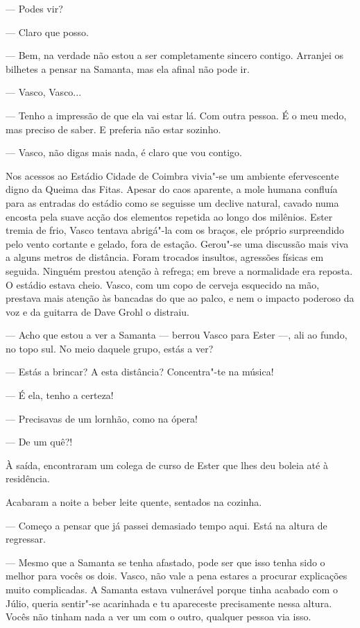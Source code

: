 --- Podes vir?

--- Claro que posso.

--- Bem, na verdade não estou a ser completamente sincero contigo.
  Arranjei os bilhetes a pensar na Samanta, mas ela afinal não pode ir.

--- Vasco, Vasco...

--- Tenho a impressão de que ela vai estar lá. Com outra pessoa. É o meu
  medo, mas preciso de saber. E preferia não estar sozinho.

--- Vasco, não digas mais nada, é claro que vou contigo.

Nos acessos ao
  Estádio Cidade de Coimbra vivia"-se um ambiente efervescente digno da Queima das Fitas. Apesar do caos
aparente, a mole humana confluía para as entradas do estádio como se
seguisse um declive natural, cavado numa encosta pela suave acção dos
elementos repetida ao longo dos milênios. Ester tremia de frio, Vasco
tentava abrigá"-la com os braços, ele próprio surpreendido pelo vento
cortante e gelado, fora de estação. Gerou"-se uma discussão mais viva a
alguns metros de distância. Foram trocados insultos, agressões físicas
em seguida. Ninguém prestou atenção à refrega; em breve a normalidade
era reposta. O estádio estava cheio. Vasco, com um copo de cerveja
esquecido na mão, prestava mais atenção às bancadas do que ao palco, e
nem o impacto poderoso da voz e da guitarra de Dave Grohl o distraiu.

--- Acho que estou a ver a Samanta --- berrou Vasco para Ester ---, ali ao
  fundo, no topo sul. No meio daquele grupo, estás a ver?

--- Estás a brincar? A esta distância? Concentra"-te na música!

--- É ela, tenho a certeza!

--- Precisavas de um lornhão, como na ópera!

--- De um quê?!


À saída, encontraram um colega de curso de Ester que lhes deu boleia até
à residência.

Acabaram a noite a beber leite quente, sentados na cozinha.

--- Começo a pensar que já passei demasiado tempo aqui.
Está na altura de regressar.

--- Mesmo que a Samanta se tenha afastado, pode ser que isso tenha sido o
  melhor para vocês os dois. Vasco, não vale a pena estares a procurar
  explicações muito complicadas. A Samanta estava vulnerável porque
  tinha acabado com o Júlio, queria sentir"-se acarinhada e tu apareceste
  precisamente nessa
altura. Vocês não tinham nada a ver um com o outro, qualquer pessoa via
isso.

